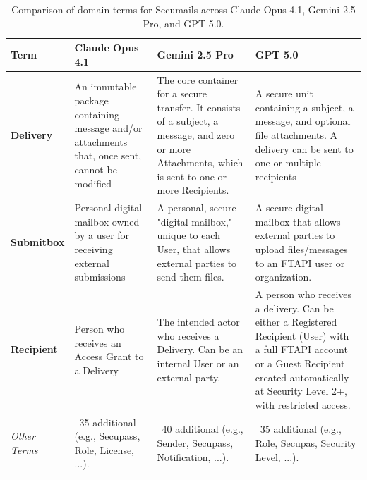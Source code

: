 \begin{table}[htbp]
    \centering
    \begin{adjustbox}{max width=\textwidth}
    \begin{tabular}{|p{2.5cm}|p{4cm}|p{4cm}|p{4cm}|}
    \hline
    \rowcolor{gray!20}
    \textbf{Term} & \textbf{Claude Opus 4.1} & \textbf{Gemini 2.5 Pro} & \textbf{GPT 5.0} \\
    \hline
    \textbf{Delivery} & 
    An immutable package containing message and/or attachments that, once sent, cannot be modified &
    The core container for a secure transfer. It consists of a subject, a message, and zero or more Attachments, which is sent to one or more Recipients. &
    A secure unit containing a subject, a message, and optional file attachments. A delivery can be sent to one or multiple recipients \\
    \hline
    \textbf{Submitbox} & 
    Personal digital mailbox owned by a user for receiving external submissions&
    A personal, secure "digital mailbox," unique to each User, that allows external parties to send them files. &
    A secure digital mailbox that allows external parties to upload files/messages to an FTAPI user or organization. \\
    \hline
    \textbf{Recipient} & 
    Person who receives an Access Grant to a Delivery &
    The intended actor who receives a Delivery. Can be an internal User or an external party. &
    A person who receives a delivery. Can be either a Registered Recipient (User) with a full FTAPI account or a Guest Recipient created automatically at Security Level 2+, with restricted access. \\
    \hline
    \rowcolor{gray!10}
    \textit{Other Terms} & 
    ~35 additional (e.g., Secupass, Role, License, ...). &
    ~40 additional (e.g., Sender, Secupass, Notification, ...). &
    ~35 additional (e.g., Role, Secupas, Security Level, ...). \\
    \hline
    \end{tabular}
    \end{adjustbox}
    \caption{Comparison of domain terms for Secumails across Claude Opus 4.1, Gemini 2.5 Pro, and GPT 5.0.}
    \label{tab:secumails-ubiquitous-language}
\end{table}

